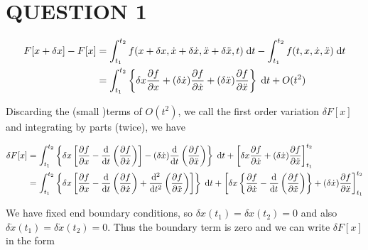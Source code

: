 \documentclass[a4paper]{article}
\begin{document}
	
\maketitle

\section{QUESTION 1}

\begin{align*}
F[x + \delta x] - F[x] & = \int_{t_{1}}^{t_{2}} f(x + \delta x, \dot{x} + \delta \dot{x}, \ddot{x} + \delta \ddot x, t ) \; \mathrm{d} t - \int_{t_{1}}^{t_2} f(t,x,\dot{x},\ddot{x}) \; \mathrm{d} t   \\
& = \int_{t_{1}}^{t_{2}} \left\{  \delta x \frac{\partial f }{\partial x} + (\delta \dot{x}) \frac{\partial f }{\partial \dot{x}} + (\delta \ddot{x}) \frac{\partial f }{\partial \ddot{x}}  \right\} \; \mathrm{d} t + O(t^{2})
\end{align*}

Discarding the (small )terms of $ O(t^{2}) $, we call the first order variation $ \delta F[x] $ and integrating by parts (twice), we have

\begin{align*}
\delta F[x]  & = \int_{t_{1}}^{t_{2}} \left\{   \delta x \left[   \frac{\partial f }{\partial x }  - \frac{\mathrm{d} }{\mathrm{d} t} \left(  \frac{\partial f }{\partial \dot{x}} \right)    \right]  - (\delta \dot{x}) \frac{\mathrm{d} }{\mathrm{d} t} \left(  \frac{\partial f }{\partial \ddot{x}} \right)   \right\} \; \mathrm{d} t + \left[  \delta x \frac{\partial f }{\partial \dot{x}} + ( \delta \dot{x}) \frac{\partial f }{\partial \ddot{x}} \right]_{t_{1}}^{t_{2}}   \\
& = \int_{t_{1}}^{t_{2}} \left\{   \delta x \left[   \frac{\partial f }{\partial x }  - \frac{\mathrm{d} }{\mathrm{d} t} \left(  \frac{\partial f }{\partial \dot{x}} \right)  +  \frac{\mathrm{d}^{2} }{\mathrm{d} t^{2}} \left(  \frac{\partial f }{\partial \ddot{x}} \right)   \right] \right\} \; \mathrm{d} t + \left[  \delta x \left\{  \frac{\partial f }{\partial \dot{x}} - \frac{\mathrm{d} }{\mathrm{d} t} \left(  \frac{\partial f }{\partial \ddot{x}} \right)  \right\}  + ( \delta \dot{x}) \frac{\partial f }{\partial \ddot{x}}  \right]_{t_{1}}^{t_{2}}
\end{align*}

We have fixed end boundary conditions, so $ \delta x(t_{1}) = \delta x(t_{2}) = 0 $ and also $ \delta \dot{x} (t_{1}) = \delta \dot{x} (t_{2}) = 0  $. Thus the boundary term is zero and we can write $ \delta F[x] $ in the form
\end{document}
